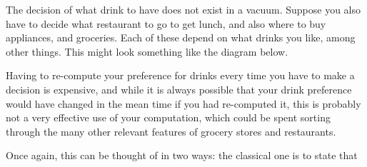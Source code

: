 \documentclass{article}
\theoremstyle{plain}
\theoremstyle{definition}
\theoremstyle{remark}
\begin{document}
	The decision of what drink to have does not exist in a vacuum. Suppose you also have to decide what restaurant to go to get lunch, and also where to buy appliances, and groceries. Each of these depend on what drinks you like, among other things. This might look something like the diagram below.
	\begin{center}
	\end{center}
	Having to re-compute your preference for drinks every time you have to make a decision is expensive, and while it is always possible that your drink preference would have changed in the mean time if you had re-computed it, this is probably not a very effective use of your computation, which could be spent sorting through the many other relevant features of grocery stores and restaurants. 
	
	Once again, this can be thought of in two ways: the classical one is to state that 
	
	
\end{document}
